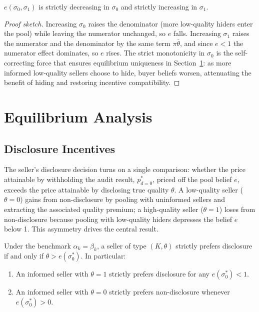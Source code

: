 \documentclass[10pt,letterpaper]{bp-template-concise}
\begin{document}
\begin{lemma}\label{lem:belief_monotone}
$e(\sigma_0,\sigma_1)$ is strictly decreasing in $\sigma_0$ and strictly increasing in $\sigma_1$.
\end{lemma}
\begin{proof}[Proof sketch]
Increasing $\sigma_0$ raises the denominator (more low-quality hiders enter the pool) while leaving the numerator unchanged, so $e$ falls. Increasing $\sigma_1$ raises the numerator and the denominator by the same term $\pi\bar{\theta}$, and since $e < 1$ the numerator effect dominates, so $e$ rises. The strict monotonicity in $\sigma_0$ is the self-correcting force that ensures equilibrium uniqueness in Section~\ref{sec:equilibrium}: as more informed low-quality sellers choose to hide, buyer beliefs worsen, attenuating the benefit of hiding and restoring incentive compatibility.
\end{proof}

\section{Equilibrium Analysis}\label{sec:equilibrium}

\subsection{Disclosure Incentives}

The seller's disclosure decision turns on a single comparison: whether the price attainable by withholding the audit result, $p^*_{d=0}$, priced off the pool belief $e$, exceeds the price attainable by disclosing true quality $\theta$. A low-quality seller ($\theta=0$) gains from non-disclosure by pooling with uninformed sellers and extracting the associated quality premium; a high-quality seller ($\theta=1$) loses from non-disclosure because pooling with low-quality hiders depresses the belief $e$ below 1. This asymmetry drives the central result.

\begin{proposition}
\label{prop:premium}
Under the benchmark $\alpha_k=\beta_k$, a seller of type $(K,\theta)$ strictly prefers disclosure if and only if $\theta > e(\sigma_0^*)$. In particular:
\begin{enumerate}[label=(\roman*)]
    \item An informed seller with $\theta=1$ strictly prefers disclosure for any $e(\sigma_0^*)<1$.
    \item An informed seller with $\theta=0$ strictly prefers non-disclosure whenever $e(\sigma_0^*)>0$.
\end{enumerate}
\end{proposition}
\end{document}
